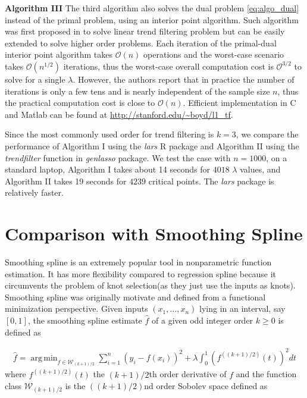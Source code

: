 \documentclass[a4paper]{article}
\DeclareMathOperator*{\argmin}{arg\,min}
\renewcommand{\cal}{\mathcal}
\begin{document}
\textbf{Algorithm III} The third algorithm also solves the dual problem \eqref{eq:algo_dual} instead of the primal problem, using an interior point algorithm. Such algorithm was first proposed in \cite{kim2009ell_1} to solve linear trend filtering problem but can be easily extended to solve higher order problems. Each iteration of the primal-dual interior point algorithm takes $\cal{O}(n)$ operations and the worst-case scenario takes $\cal{O}(n^{1/2})$ iterations, thus the worst-case overall computation cost is $\cal{O}^{3/2}$ to solve for a single $\lambda$. However, the authors report that in practice the number of iterations is only a few tens and is nearly independent of the sample size $n$, thus the practical computation cost is close to $\cal{O}(n)$. Efficient implementation in C and Matlab can be found at \url{http://stanford.edu/~boyd/l1_tf}. 

Since the most commonly used order for trend filtering is $k = 3$, we compare the performance of Algorithm I using the \textit{lars} R package and Algorithm II using the \textit{trendfilter} function in \textit{genlasso} package. We test the case with $n = 1000$, on a standard laptop, Algorithm I takes about 14 seconds for $4018$ $\lambda$ values, and Algorithm II takes 19 seconds for $4239$ critical points. The \textit{lars} package is relatively faster. 


\section{Comparison with Smoothing Spline}
\label{sec:comp_ss}
Smoothing spline is an extremely popular tool in nonparametric function estimation. It has more flexibility compared to regression spline because it circumvents the problem of knot selection(as they just use the inputs as knots). Smoothing spline was originally motivate and defined from a functional minimization perspective. Given inputs $(x_1,\ldots, x_n)$ lying in an interval, say $[0, 1]$, the smoothing spline estimate $\hat{f}$ of a given odd integer order $k\geq 0$ is defined as

\begin{align}
\hat{f} = \argmin_{f\in\cal{W}_{(k+1)/2}}\sum_{i=1}^n (y_i - f(x_i))^2 + \lambda \int_0^1 (f^{((k+1)/2)}(t))^2dt
\label{eq:ss}
\end{align}
where $f^{((k+1)/2)}(t)$ the $(k+1)/2$th order derivative of $f$ and the function class $\cal{W}_{(k+1)/2}$ is the $((k+1)/2)$nd order Sobolev space defined as
\end{document}
